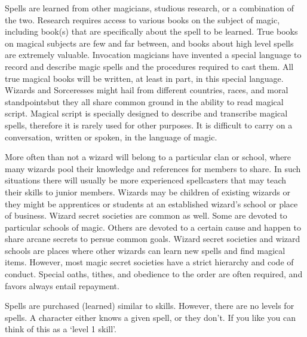 \documentclass[twoside]{book}
\begin{document}
    {  
      Spells are learned from other magicians, studious
               research, or a combination of the two. Research requires
               access to various books on the subject of magic, including
               book(s) that are specifically about the spell to be
               learned. True books on magical subjects are few and far
               between, and books about high level spells are extremely
               valuable. Invocation magicians have invented a special
               language to record and describe magic spells and the
               procedures required to cast them. All true magical books
               will be written, at least in part, in this special
               language. Wizards and Sorceresses might hail from
               different countries, races, and moral
               standpointsbut they all share common ground in the
               ability to read magical script. Magical script is
               specially designed to describe and transcribe magical
               spells, therefore it is rarely used for other purposes. It
               is difficult to carry on a conversation, written or
               spoken, in the language of magic. 
    }
  
    {  
      More often than not a wizard will belong to a
               particular clan or school, where many wizards pool their
               knowledge and references for members to share. In such
               situations there will usually be more experienced
               spellcasters that may teach their skills to junior
               members. Wizards may be children of existing wizards or
               they might be apprentices or students at an established
               wizard's school or place of business. Wizard secret
               societies are common as well. Some are devoted to
               particular schools of magic. Others are devoted to a
               certain cause and happen to share arcane secrets to persue
               common goals. Wizard secret societies and wizard schools
               are places where other wizards can learn new spells and
               find magical items. However, most magic secret societies
               have a strict hierarchy and code of conduct. Special
               oaths, tithes, and obedience to the order are often
               required, and favors always entail repayment. 
    }
  
    {  
      Spells are purchased (learned) similar to skills.
               However, there are no levels for spells. A character
               either knows a given spell, or they don't. If you
               like you can think of this as a `level 1
               skill'. 
    }
  
\end{document}
